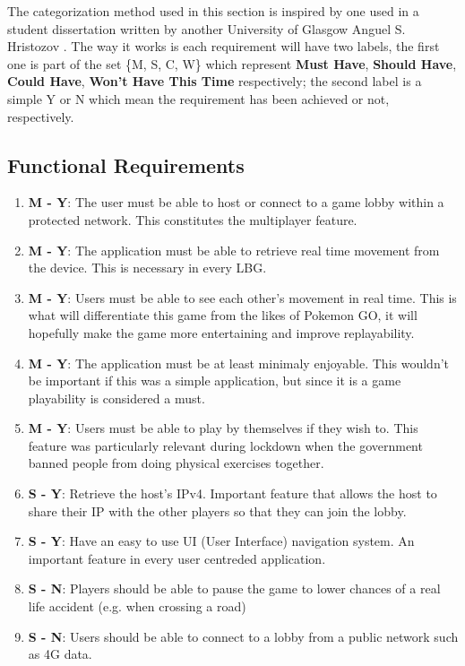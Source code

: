 \documentclass{dissertation}
\begin{document}
The categorization method used in this section is inspired by one used in a student dissertation written by another University of Glasgow Anguel S. Hristozov \citep{Anguel20}. The 
way it works is each requirement will have two labels, the first one is part of the set \{M, S, C, W\} which represent \textbf{Must Have}, \textbf{Should Have}, \textbf{Could Have}, 
\textbf{Won't Have This Time} respectively; the second label is a simple Y or N which mean the requirement has been achieved or not, respectively.

\subsection{Functional Requirements}

\begin{enumerate}
\item \textbf{M - Y}: The user must be able to host or connect to a game lobby within a protected network. This constitutes the multiplayer feature.
\item \textbf{M - Y}: The application must be able to retrieve real time movement from the device. This is necessary in every LBG.
\item \textbf{M - Y}: Users must be able to see each other's movement in real time. This is what will differentiate this game from the likes of Pokemon GO, it will hopefully make the 
game more entertaining and improve replayability.
\item \textbf{M - Y}: The application must be at least minimaly enjoyable. This wouldn't be important if this was a simple application, but since it is a game playability is considered a must.
\item \textbf{M - Y}: Users must be able to play by themselves if they wish to. This feature was particularly relevant during lockdown when the government banned people from doing 
physical exercises together.
\item \textbf{S - Y}: Retrieve the host's IPv4. Important feature that allows the host to share their IP with the other players so that they can join the lobby.
\item \textbf{S - Y}: Have an easy to use UI (User Interface) navigation system. An important feature in every user centreded application.
\item \textbf{S - N}: Players should be able to pause the game to lower chances of a real life accident (e.g. when crossing a road)
\item \textbf{S - N}: Users should be able to connect to a lobby from a public network such as 4G data.

\end{enumerate}
\end{document}
